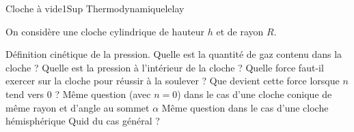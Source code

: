 \begin{exercise}{Cloche à vide}{1}{Sup}
{Thermodynamique}{lelay}

On considère une cloche cylindrique de hauteur $h$ et de rayon $R$.

\begin{questions}
    \questioncours Définition cinétique de la pression.
    \question Quelle est la quantité de gaz contenu dans la cloche ?
    \question Quelle est la pression à l'intérieur de la cloche ?
    \question Quelle force faut-il exercer sur la cloche pour réussir à la soulever ?
    \question Que devient cette force lorsque $n$ tend vers 0 ?
    \question Même question (avec $n = 0$) dans le cas d'une cloche conique de même rayon et d'angle au sommet $\alpha$
    \question Même question dans le cas d'une cloche hémisphérique
    \question Quid du cas général ?
\end{questions}

\end{exercise}